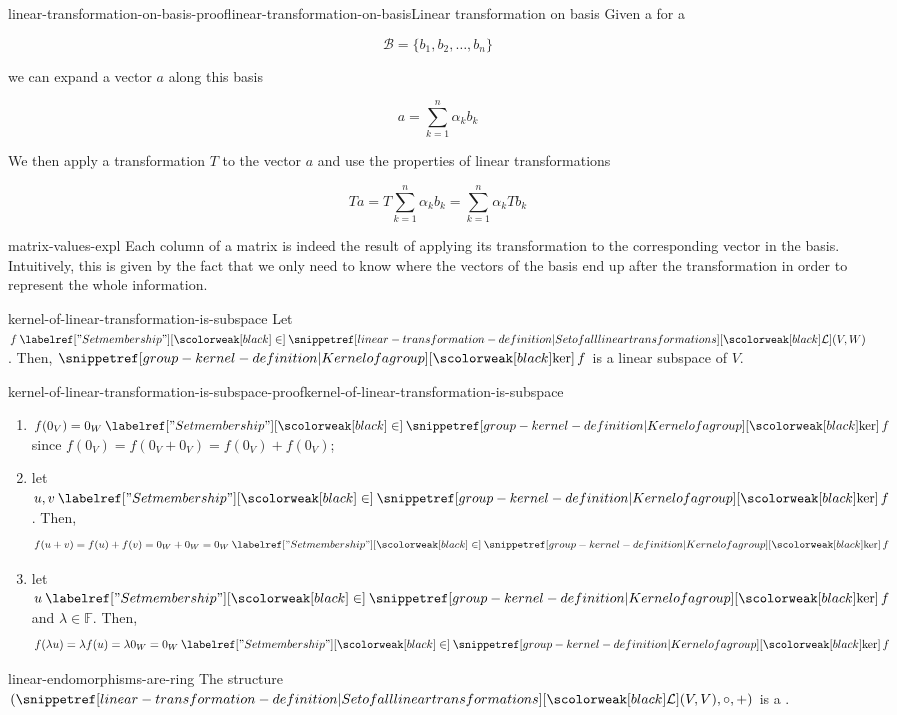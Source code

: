 \documentclass[preview]{standalone}
\begin{document}
\begin{snippetproof}{linear-transformation-on-basis-proof}{linear-transformation-on-basis}{Linear transformation on basis}
    Given a \basis for a \vectorspace

    \[
        \mathcal{B}=\{b_1, b_2, \ldots, b_n\}
    \]

    we can expand a vector \(a\) along this basis

    \[
        a = \sum_{k=1}^{n} \alpha_k b_k
    \]

    We then apply a transformation \(T\) to the vector \(a\) and use the properties of
    linear transformations
    
    \[
        Ta
        = T\sum_{k=1}^{n} \alpha_k b_k
        = \sum_{k=1}^{n} \alpha_k Tb_k
    \]
\end{snippetproof}

\begin{snippet}{matrix-values-expl}
    Each column of a matrix is indeed the result of applying its transformation
    to the corresponding vector in the basis.
    Intuitively, this is given by the fact that we only need to know where the vectors of the basis
    end up after the transformation in order to represent the whole information.
\end{snippet}

\begin{snippetproposition}{kernel-of-linear-transformation-is-subspace}{}
    Let \(f \in \setoflineartransformations(V, W)\). Then, \(\grpker f\) is a linear subspace of \(V\).
\end{snippetproposition}

\begin{snippetproof}{kernel-of-linear-transformation-is-subspace-proof}{kernel-of-linear-transformation-is-subspace}{}
    \begin{enumerate}
        \item \(f(0_V) = 0_W \in \grpker f\) since \(f(0_V) = f(0_V + 0_V) = f(0_V) +f(0_V)\);
        \item let \(u,v \in \grpker f\). Then,
        \[
            f(u+v) = f(u) + f(v) = 0_W + 0_W = 0_W \in \grpker f
        \]
        \item let \(u \in \grpker f\) and \(\lambda \in \mathbb{F}\). Then,
        \[
            f(\lambda u) = \lambda f(u) = \lambda 0_W = 0_W \in \grpker f
        \]
    \end{enumerate}
\end{snippetproof}

\begin{snippetproposition}{linear-endomorphisms-are-ring}{}
    The structure \((\setoflineartransformations(V, V), \circ, +)\) is a \ring.
\end{snippetproposition}
\end{document}
